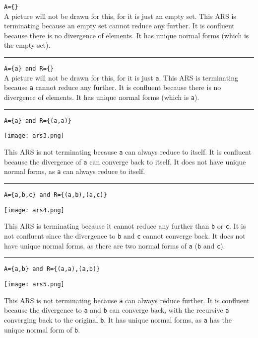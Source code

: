 \documentclass{article}
\theoremstyle{theorem}
\theoremstyle{definition}
\theoremstyle{remark}
\begin{document}
\noindent \texttt{A=\{\}}\\
A picture will not be drawn for this, for it is just an empty set. This ARS is terminating because an empty set cannot reduce any further. It is confluent because there is no divergence of elements. It has unique normal forms (which is the empty set).

\noindent\rule{\textwidth}{1pt}

\noindent \texttt{A=\{a\} and R=\{\}}\\
A picture will not be drawn for this, for it is just \texttt{a}. This ARS is terminating because \texttt{a} cannot reduce any further. It is confluent because there is no divergence of elements. It has unique normal forms (which is \texttt{a}).

\noindent\rule{\textwidth}{1pt}

\noindent \texttt{A=\{a\} and R=\{(a,a)\}}
\begin{center}
    \texttt{[image: ars3.png]}
\end{center}
This ARS is not terminating because \texttt{a} can always reduce to itself. It is confluent because the divergence of \texttt{a} can converge back to itself. It does not have unique normal forms, as \texttt{a} can always reduce to itself.

\noindent\rule{\textwidth}{1pt}

\noindent \texttt{A=\{a,b,c\} and R=\{(a,b),(a,c)\}}
\begin{center}
    \texttt{[image: ars4.png]}
\end{center}
This ARS is terminating because it cannot reduce any further than \texttt{b} or \texttt{c}. It is not confluent since the divergence to \texttt{b} and \texttt{c} cannot converge back. It does not have unique normal forms, as there are two normal forms of \texttt{a} (\texttt{b} and \texttt{c}).

\noindent\rule{\textwidth}{1pt}

\noindent \texttt{A=\{a,b\} and R=\{(a,a),(a,b)\}}
\begin{center}
    \texttt{[image: ars5.png]}
\end{center}
This ARS is not terminating because \texttt{a} can always reduce further. It is confluent because the divergence to \texttt{a} and \texttt{b} can converge back, with the recursive \texttt{a} converging back to the original \texttt{b}. It has unique normal forms, as \texttt{a} has the unique normal form of \texttt{b}.

\newpage
\end{document}
